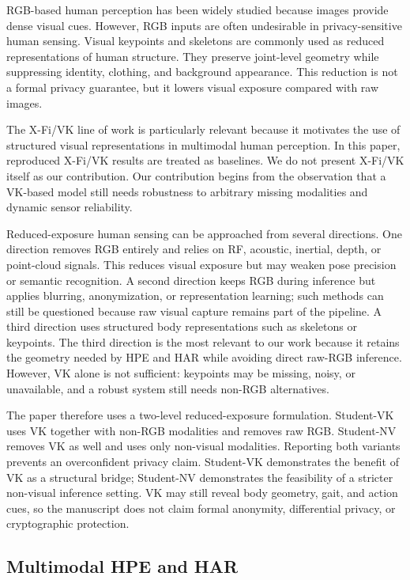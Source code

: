 \documentclass[preprint,12pt]{elsarticle}
\begin{document}
RGB-based human perception has been widely studied because images provide dense visual cues. However, RGB inputs are often undesirable in privacy-sensitive human sensing. Visual keypoints and skeletons are commonly used as reduced representations of human structure. They preserve joint-level geometry while suppressing identity, clothing, and background appearance. This reduction is not a formal privacy guarantee, but it lowers visual exposure compared with raw images.

The X-Fi/VK line of work is particularly relevant because it motivates the use of structured visual representations in multimodal human perception. In this paper, reproduced X-Fi/VK results are treated as baselines. We do not present X-Fi/VK itself as our contribution. Our contribution begins from the observation that a VK-based model still needs robustness to arbitrary missing modalities and dynamic sensor reliability.

Reduced-exposure human sensing can be approached from several directions. One direction removes RGB entirely and relies on RF, acoustic, inertial, depth, or point-cloud signals. This reduces visual exposure but may weaken pose precision or semantic recognition. A second direction keeps RGB during inference but applies blurring, anonymization, or representation learning; such methods can still be questioned because raw visual capture remains part of the pipeline. A third direction uses structured body representations such as skeletons or keypoints. The third direction is the most relevant to our work because it retains the geometry needed by HPE and HAR while avoiding direct raw-RGB inference. However, VK alone is not sufficient: keypoints may be missing, noisy, or unavailable, and a robust system still needs non-RGB alternatives.

The paper therefore uses a two-level reduced-exposure formulation. Student-VK uses VK together with non-RGB modalities and removes raw RGB. Student-NV removes VK as well and uses only non-visual modalities. Reporting both variants prevents an overconfident privacy claim. Student-VK demonstrates the benefit of VK as a structural bridge; Student-NV demonstrates the feasibility of a stricter non-visual inference setting. VK may still reveal body geometry, gait, and action cues, so the manuscript does not claim formal anonymity, differential privacy, or cryptographic protection.

\subsection{Multimodal HPE and HAR}
\end{document}
